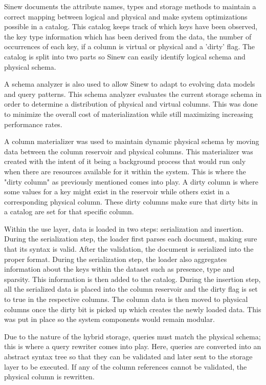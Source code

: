 \documentclass[sigconf]{acmart}
\begin{document}
   Sinew documents the attribute names, types and storage methods to maintain a correct mapping between logical and physical and make system optimizations possible in a catalog. This catalog keeps track of which keys have been observed, the key type information which has been derived from the data, the number of occurrences of each key, if a column is virtual or physical and a 'dirty' flag. The catalog is split into two parts so Sinew can easily identify logical schema and physical schema.

   A schema analyzer is also used to allow Sinew to adapt to evolving data models and query patterns. This schema analyzer evaluates the current storage schema in order to determine a distribution of physical and virtual columns. This was done to minimize the overall cost of materialization while still maximizing increasing performance rates.

   A column materializer was used to maintain dynamic physical schema by moving data between the column reservoir and physical columns. This materializer was created with the intent of it being a background process that would run only when there are resources available for it within the system. This is where the "dirty column" as previously mentioned comes into play. A dirty column is where some values for a key might exist in the reservoir while others exist in a corresponding physical column. These dirty columns make sure that dirty bits in a catalog are set for that specific column.

   Within the use layer, data is loaded in two steps: serialization and insertion. During the serialization step, the loader first parses each document, making sure that its syntax is valid. After the validation, the document is serialized into the proper format. During the serialization step, the loader also aggregates information about the keys within the dataset such as presence, type and sparsity. This information is then added to the catalog. During the insertion step, all the serialized data is placed into the column reservoir and the dirty flag is set to true in the respective columns. The column data is then moved to physical columns once the dirty bit is picked up which creates the newly loaded data. This was put in place so the system components would remain modular.

   Due to the nature of the hybrid storage, queries must match the physical schema; this is where a query rewriter comes into play. Here, queries are converted into an abstract syntax tree so that they can be validated and later sent to the storage layer to be executed. If any of the column references cannot be validated, the physical column is rewritten.
\end{document}
